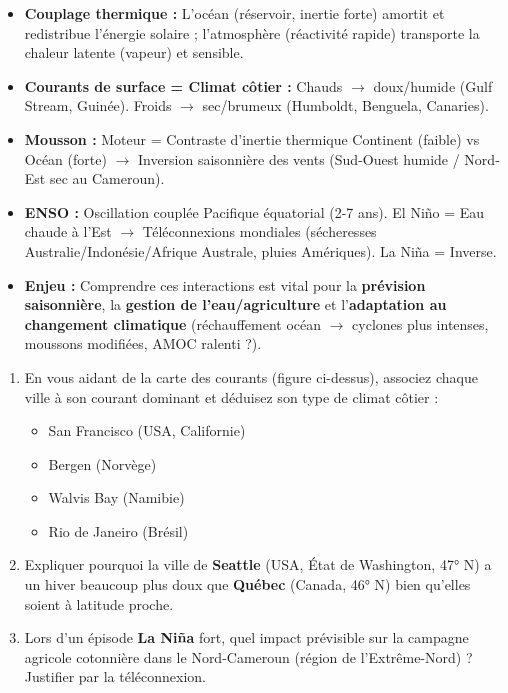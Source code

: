\documentclass[11pt]{article}
\begin{document}
\begin{aretenir}
\begin{itemize}
    \item \textbf{Couplage thermique :} L'océan (réservoir, inertie forte) amortit et redistribue l'énergie solaire ; l'atmosphère (réactivité rapide) transporte la chaleur latente (vapeur) et sensible.
    \item \textbf{Courants de surface = Climat côtier :} Chauds $\rightarrow$ doux/humide (Gulf Stream, Guinée). Froids $\rightarrow$ sec/brumeux (Humboldt, Benguela, Canaries).
    \item \textbf{Mousson :} Moteur = Contraste d'inertie thermique Continent (faible) vs Océan (forte) $\rightarrow$ Inversion saisonnière des vents (Sud-Ouest humide / Nord-Est sec au Cameroun).
    \item \textbf{ENSO :} Oscillation couplée Pacifique équatorial (2-7 ans). El Niño = Eau chaude à l'Est $\rightarrow$ Téléconnexions mondiales (sécheresses Australie/Indonésie/Afrique Australe, pluies Amériques). La Niña = Inverse.
    \item \textbf{Enjeu :} Comprendre ces interactions est vital pour la \textbf{prévision saisonnière}, la \textbf{gestion de l'eau/agriculture} et l'\textbf{adaptation au changement climatique} (réchauffement océan $\rightarrow$ cyclones plus intenses, moussons modifiées, AMOC ralenti ?).
\end{itemize}
\end{aretenir}

\begin{exercice}
\begin{enumerate}
    \item En vous aidant de la carte des courants (figure ci-dessus), associez chaque ville à son courant dominant et déduisez son type de climat côtier :
    \begin{itemize}
        \item San Francisco (USA, Californie)
        \item Bergen (Norvège)
        \item Walvis Bay (Namibie)
        \item Rio de Janeiro (Brésil)
    \end{itemize}
    \item Expliquer pourquoi la ville de \textbf{Seattle} (USA, État de Washington, 47° N) a un hiver beaucoup plus doux que \textbf{Québec} (Canada, 46° N) bien qu'elles soient à latitude proche.
    \item Lors d'un épisode \textbf{La Niña} fort, quel impact prévisible sur la campagne agricole cotonnière dans le Nord-Cameroun (région de l'Extrême-Nord) ? Justifier par la téléconnexion.
\end{enumerate}
\end{exercice}
\end{document}
